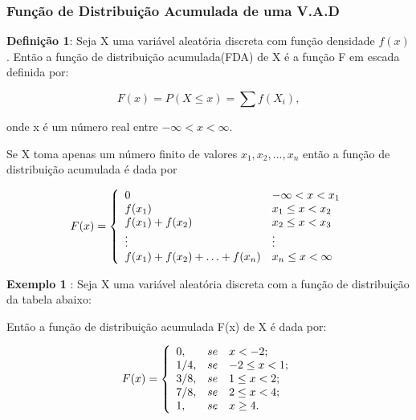 \subsubsection{Função de Distribuição Acumulada de uma V.A.D}

\textbf{Definição 1}: Seja X uma variável aleatória discreta com
função densidade $f(x)$. Então a função de distribuição
acumulada(FDA) de X é a função F em escada definida por:

\begin{equation}\label{}
    F(x)=P(X \leq x)= \sum f(X_{i}),
\end{equation}

onde x é um número real entre $-\infty < x < \infty$.\vskip0.3cm


Se X toma apenas um número finito de valores $x_{1},x_{2},...,x_{n}$ então a função de distribuição acumulada é dada por

$$
F(x)=
\left\{%
\begin{array}{ll}
    0                                     & \hbox{$-\infty< x < x_{1}$} \\
    f(x_{1})                              & \hbox{$x_{1} \leq x < x_{2}$} \\
    f(x_{1})+f(x_{2})                     & \hbox{$x_{2} \leq x < x_{3}$} \\
    \vdots                                & \hbox{$\vdots$} \\
    f(x_{1})+f(x_{2})+\ldots+  f(x_{n})   & \hbox{$x_{n} \leq x < \infty$} \\
\end{array}%
\right.
$$


\textbf{Exemplo 1} : Seja X uma variável aleatória discreta com a
função de distribuição da tabela abaixo:


\begin{table}[!htb]
\end{table}


Então a função de distribuição acumulada F(x) de X é dada por:

$$
F(x)=
\left\{%
\begin{array}{ll}
   0   , & se \quad \hbox{$x < -2$;} \\
   1/4 , & se \quad \hbox{$-2 \leq x < 1$;} \\
   3/8 , & se \quad \hbox{$1 \leq x < 2$;} \\
   7/8 , & se \quad \hbox{$2 \leq x < 4$;} \\
   1   , & se \quad \hbox{$x \geq 4$.} \\
\end{array}%
\right.
$$

